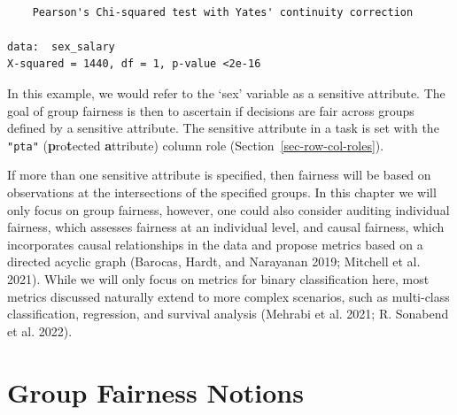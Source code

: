 \begin{Shaded}
\begin{Highlighting}[]
\end{Highlighting}
\end{Shaded}

\begin{verbatim}

    Pearson's Chi-squared test with Yates' continuity correction

data:  sex_salary
X-squared = 1440, df = 1, p-value <2e-16
\end{verbatim}

In this example, we would refer to the `sex' variable as a sensitive
attribute. The goal of group fairness is then to
ascertain if decisions are fair across groups defined by a sensitive
attribute. The sensitive attribute in a task is set with the
\texttt{"pta"} (\textbf{p}ro\textbf{t}ected \textbf{a}ttribute) column
role (Section~\ref{sec-row-col-roles}).

\begin{Shaded}
\begin{Highlighting}[]
\SpecialCharTok{$}\NormalTok{(}\NormalTok{, } \NormalTok{)}
\end{Highlighting}
\end{Shaded}

If more than one sensitive attribute is specified, then fairness will be
based on observations at the intersections of the specified groups. In
this chapter we will only focus on group fairness, however, one could
also consider auditing individual
fairness, which assesses fairness
at an individual level, and causal
fairness, which incorporates causal
relationships in the data and propose metrics based on a directed
acyclic graph (Barocas, Hardt, and Narayanan 2019; Mitchell et al.
2021). While we will only focus on metrics for binary classification
here, most metrics discussed naturally extend to more complex scenarios,
such as multi-class classification, regression, and survival analysis
(Mehrabi et al. 2021; R. Sonabend et al. 2022).

\hypertarget{group-fairness-notions}{%
\section{Group Fairness Notions}\label{group-fairness-notions}}

